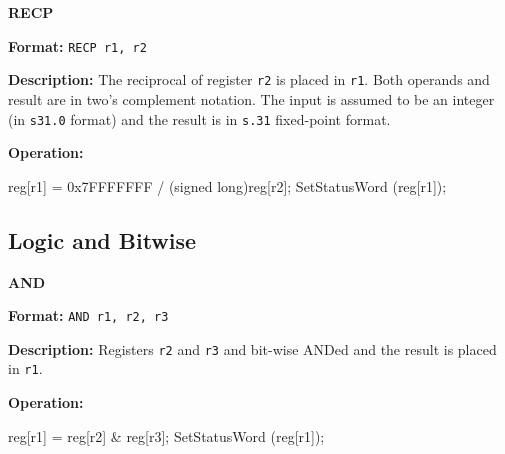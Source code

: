 \noindent\textsf{\textbf{\Large RECP}}\par
{}\par\begin{indented}{\bf Format:}
{\tt RECP r1, r2}\par\vspace{3ex}
\end{indented}\vspace{4ex}
\begin{indented}{\bf Description:}
The reciprocal of register {\tt r2} is placed in {\tt r1}.  Both operands
and result are in two's complement notation.  The input is assumed to
be an integer (in {\tt s31.0} format) and the result is in {\tt s.31}
fixed-point format.
\end{indented}
\begin{indented}{\bf Operation:}\vspace{.8ex}
\begin{verbatimtab}
reg[r1] = 0x7FFFFFFF / (signed long)reg[r2];
SetStatusWord (reg[r1]);
\end{verbatimtab}
\end{indented}
\vspace{2em}

\newpage
\subsection{Logic and Bitwise}
\noindent\textsf{\textbf{\Large AND}}\par
{}\par\begin{indented}{\bf Format:}
{\tt AND r1, r2, r3}\par\vspace{3ex}
\end{indented}\vspace{4ex}
\begin{indented}{\bf Description:}
Registers {\tt r2} and {\tt r3} and bit-wise ANDed and the result is
placed in {\tt r1}.
\end{indented}
\begin{indented}{\bf Operation:}\vspace{.8ex}
\begin{verbatimtab}
reg[r1] = reg[r2] & reg[r3];
SetStatusWord (reg[r1]);
\end{verbatimtab}
\end{indented}
\vspace{2em}

